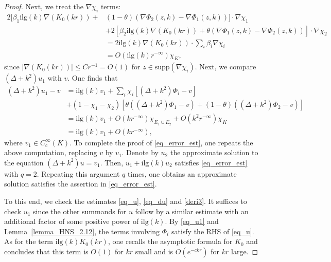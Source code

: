 \documentclass[12pt]{amsart}
\begin{document}
\begin{proof}
Next, we treat the $\nabla \chi_i$ terms:
\begin{align*}
    2 \big[ \beta_1 \textrm{ilg}(k) \nabla(K_0(kr)) + & (1-\theta)\left( \nabla \Phi_2(z,k) - \nabla \Phi_1(z,k) \right) \big] \cdot \nabla \chi_1\\
    &+ 2 \left[ \beta_2 \textrm{ilg}(k) \nabla(K_0(kr)) + \theta \left(\nabla \Phi_1(z,k) - \nabla \Phi_2(z,k) \right) \right] \cdot \nabla \chi_2\\
    &= 2 \textrm{ilg}(k) \nabla (K_0(kr)) \cdot \sum_i \beta_i \nabla \chi_i\\
    &= O(\textrm{ilg}(k) r^{-\infty}) \chi_K,
\end{align*}
since $|\nabla (K_0(kr))|\le C r^{-1} = O(1)$ for $z\in \textrm{supp}(\nabla \chi_i)$. Next, we compare $(\Delta+k^2)u_1$ with $v$. One finds that
\begin{align*}
    (\Delta + k^2)u_1 - v &= \textrm{ilg}(k) v_1 + \sum_i \chi_i \left[ (\Delta+k^2)\Phi_i - v \right]\\
    &+ (1-\chi_1-\chi_2) \left[ \theta \left( (\Delta+k^2)\Phi_1 - v \right) + (1-\theta) \left( (\Delta+k^2)\Phi_2 - v \right) \right]\\
    &= \textrm{ilg}(k) v_1 + O(k r^{-\infty})\chi_{E_1 \cup E_2} + O(k^2 r^{-\infty})\chi_K\\
    &= \textrm{ilg}(k) v_1 + O(k r^{-\infty}),
\end{align*}
where $v_1 \in C_c^\infty(K)$. To complete the proof of \eqref{eq_error_est}, one repeats the above computation, replacing $v$ by $v_1$. Denote by $u_2$ the approximate solution to the equation $(\Delta+k^2)u = v_1$. Then, $u_1 + \textrm{ilg}(k)u_2$ satisfies \eqref{eq_error_est} with $q=2$. Repeating this argument $q$ times, one obtains an approximate solution satisfies the assertion in \eqref{eq_error_est}.

To this end, we check the estimates \eqref{eq_u}, \eqref{eq_du} and \eqref{deri3}. It suffices to check $u_1$ since the other summands for $u$ follow by a similar estimate with an additional factor of some positive power of $\textrm{ilg}(k)$. By \eqref{eq_u1} and Lemma~\ref{lemma_HNS_2.12}, the terms involving $\Phi_i$ satisfy the RHS of \eqref{eq_u}. As for the term $\textrm{ilg}(k) K_0(kr)$, one recalls the asymptotic formula for $K_0$ and concludes that this term is $O(1)$ for $kr$ small and is $O(e^{-ckr})$ for $kr$ large.


\end{proof}
\end{document}
